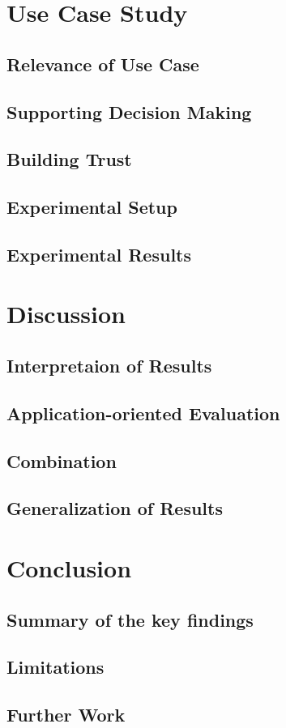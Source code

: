\documentclass{article}
\begin{document}
\section{Use Case Study}
\subsection{Relevance of Use Case}
\subsection{Supporting Decision Making}
\subsection{Building Trust}
\subsection{Experimental Setup}
\subsection{Experimental Results}

\section{Discussion}
\subsection{Interpretaion of Results}
\subsection{Application-oriented Evaluation}
\subsection{Combination}
\subsection{Generalization of Results}

\section{Conclusion}
\subsection{Summary of the key findings}
\subsection{Limitations}
\subsection{Further Work}






\appendix
\end{document}
